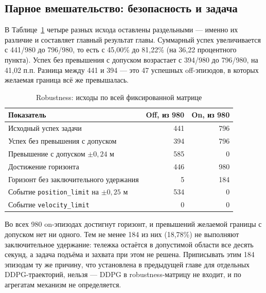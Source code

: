 \subsection{Парное вмешательство: безопасность и задача}
В Таблице~\ref{tab:robust_total} четыре разных исхода оставлены раздельными — именно их различие и составляет главный результат главы. Суммарный успех увеличивается с 441/980 до 796/980, то есть с 45,00\% до 81,22\% (на 36,22 процентного пункта). Успех без превышения с допуском возрастает с 394/980 до 796/980, на 41,02 п.п. Разница между 441 и 394 — это 47 успешных off-эпизодов, в которых желаемая граница всё же превышалась.
\begin{table}[htbp]\caption{Robustness: исходы по всей фиксированной матрице}\label{tab:robust_total}
\begin{smalltable}\begin{tabularx}{\linewidth}{@{}Xrr@{}}\toprule
Показатель & Off, из 980 & On, из 980\\\midrule
Исходный успех задачи & 441 & 796\\
Успех без превышения с допуском & 394 & 796\\
Превышение с допуском $\pm0{,}24$ м & 585 & 0\\
Достижение горизонта & 446 & 980\\
Горизонт без заключительного удержания & 5 & 184\\
Событие \texttt{position\_limit} на $\pm0{,}25$ м & 534 & 0\\
Событие \texttt{velocity\_limit} & 0 & 0\\\bottomrule
\end{tabularx}\end{smalltable}
\end{table}

Во всех 980 on-эпизодах достигнут горизонт, и превышений желаемой границы с допуском нет ни одного. Тем не менее 184 из них (18,78\%) не выполняют заключительное удержание: тележка остаётся в допустимой области все десять секунд, а задача подъёма и захвата при этом не решена. Приписывать этим 184 эпизодам ту же причину, что установлена в предыдущей главе для отдельных DDPG-траекторий, нельзя — DDPG в robustness-матрицу не входит, и по агрегатам механизм не определяется.

